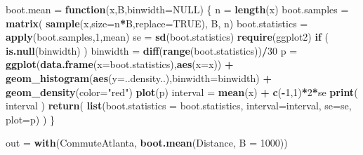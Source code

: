 \documentclass[]{book}
\newenvironment{Shaded}{\begin{snugshade}}{\end{snugshade}}
\newcommand{\ControlFlowTok}[1]{\textcolor[rgb]{0.13,0.29,0.53}{\textbf{#1}}}
\newcommand{\DataTypeTok}[1]{\textcolor[rgb]{0.13,0.29,0.53}{#1}}
\newcommand{\DecValTok}[1]{\textcolor[rgb]{0.00,0.00,0.81}{#1}}
\newcommand{\KeywordTok}[1]{\textcolor[rgb]{0.13,0.29,0.53}{\textbf{#1}}}
\newcommand{\NormalTok}[1]{#1}
\newcommand{\OperatorTok}[1]{\textcolor[rgb]{0.81,0.36,0.00}{\textbf{#1}}}
\newcommand{\OtherTok}[1]{\textcolor[rgb]{0.56,0.35,0.01}{#1}}
\newcommand{\StringTok}[1]{\textcolor[rgb]{0.31,0.60,0.02}{#1}}
\begin{document}
\begin{Shaded}
\begin{Highlighting}[]
\NormalTok{boot.mean =}\StringTok{ }\ControlFlowTok{function}\NormalTok{(x,B,}\DataTypeTok{binwidth=}\OtherTok{NULL}\NormalTok{)}
\NormalTok{\{}
\NormalTok{n =}\StringTok{ }\KeywordTok{length}\NormalTok{(x)}
\NormalTok{boot.samples =}\StringTok{ }\KeywordTok{matrix}\NormalTok{( }\KeywordTok{sample}\NormalTok{(x,}\DataTypeTok{size=}\NormalTok{n}\OperatorTok{*}\NormalTok{B,}\DataTypeTok{replace=}\OtherTok{TRUE}\NormalTok{), B, n)}
\NormalTok{boot.statistics =}\StringTok{ }\KeywordTok{apply}\NormalTok{(boot.samples,}\DecValTok{1}\NormalTok{,mean)}
\NormalTok{se =}\StringTok{ }\KeywordTok{sd}\NormalTok{(boot.statistics)}
\KeywordTok{require}\NormalTok{(ggplot2)}
\ControlFlowTok{if}\NormalTok{ ( }\KeywordTok{is.null}\NormalTok{(binwidth) )}
\NormalTok{binwidth =}\StringTok{ }\KeywordTok{diff}\NormalTok{(}\KeywordTok{range}\NormalTok{(boot.statistics))}\OperatorTok{/}\DecValTok{30}
\NormalTok{p =}\StringTok{ }\KeywordTok{ggplot}\NormalTok{(}\KeywordTok{data.frame}\NormalTok{(}\DataTypeTok{x=}\NormalTok{boot.statistics),}\KeywordTok{aes}\NormalTok{(}\DataTypeTok{x=}\NormalTok{x)) }\OperatorTok{+}
\KeywordTok{geom_histogram}\NormalTok{(}\KeywordTok{aes}\NormalTok{(}\DataTypeTok{y=}\NormalTok{..density..),}\DataTypeTok{binwidth=}\NormalTok{binwidth) }\OperatorTok{+}\StringTok{ }\KeywordTok{geom_density}\NormalTok{(}\DataTypeTok{color=}\StringTok{"red"}\NormalTok{)}
\KeywordTok{plot}\NormalTok{(p)}
\NormalTok{interval =}\StringTok{ }\KeywordTok{mean}\NormalTok{(x) }\OperatorTok{+}\StringTok{ }\KeywordTok{c}\NormalTok{(}\OperatorTok{-}\DecValTok{1}\NormalTok{,}\DecValTok{1}\NormalTok{)}\OperatorTok{*}\DecValTok{2}\OperatorTok{*}\NormalTok{se}
\KeywordTok{print}\NormalTok{( interval )}
\KeywordTok{return}\NormalTok{( }\KeywordTok{list}\NormalTok{(}\DataTypeTok{boot.statistics =}\NormalTok{ boot.statistics, }\DataTypeTok{interval=}\NormalTok{interval, }\DataTypeTok{se=}\NormalTok{se, }\DataTypeTok{plot=}\NormalTok{p) )}
\NormalTok{\}}
\end{Highlighting}
\end{Shaded}

\begin{Shaded}
\begin{Highlighting}[]
\NormalTok{out =}\StringTok{ }\KeywordTok{with}\NormalTok{(CommuteAtlanta, }\KeywordTok{boot.mean}\NormalTok{(Distance, }\DataTypeTok{B =} \DecValTok{1000}\NormalTok{))}
\end{Highlighting}
\end{Shaded}
\end{document}
